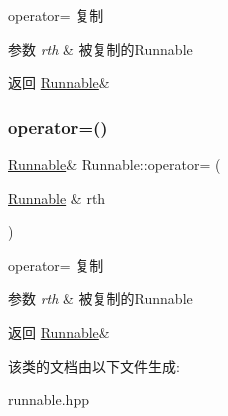operator= 复制 


\begin{DoxyParams}{参数}
{\em rth} & 被复制的\+Runnable\\
\hline
\end{DoxyParams}
\begin{DoxyReturn}{返回}
\hyperlink{classRunnable}{Runnable}\& 
\end{DoxyReturn}
\mbox{\label{classRunnable_a998834d5321cd0f014dd90f3f8785c02}} 
\subsubsection{\texorpdfstring{operator=()}{operator=()}\hspace{0.1cm}{\footnotesize\ttfamily [2/2]}}
{\footnotesize\ttfamily \hyperlink{classRunnable}{Runnable}\& Runnable\+::operator= (\begin{DoxyParamCaption}\item[{\hyperlink{classRunnable}{Runnable} \&}]{rth }\end{DoxyParamCaption})\hspace{0.3cm}{\ttfamily [inline]}}



operator= 复制 


\begin{DoxyParams}{参数}
{\em rth} & 被复制的\+Runnable\\
\hline
\end{DoxyParams}
\begin{DoxyReturn}{返回}
\hyperlink{classRunnable}{Runnable}\& 
\end{DoxyReturn}


该类的文档由以下文件生成\+:\begin{DoxyCompactItemize}
\item 
runnable.\+hpp\end{DoxyCompactItemize}
